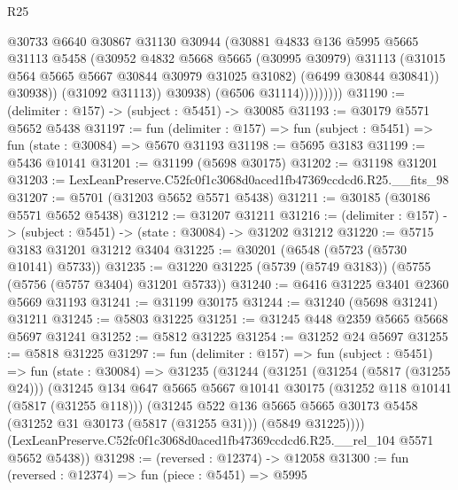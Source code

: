 \begin{lexlean}{R25}
\begin{coremodule}
                          @30733
                          @6640
                          @30867
                          @31130
                          @30944
                          (@30881
                            @4833
                            @136
                            @5995
                            @5665
                            @31113
                            @5458
                            (@30952
                              @4832
                              @5668
                              @5665
                              (@30995 @30979)
                              @31113
                              (@31015 @564 @5665 @5667 @30844 @30979 @31025 @31082)
                              (@6499 @30844 @30841))
                            @30938))
                        (@31092 @31113))
                      @30938)
                    (@6506 @31114)))))))))
@31190 := (delimiter : @157) -> (subject : @5451) -> @30085
@31193 := @30179 @5571 @5652 @5438
@31197 := fun (delimiter : @157) => fun (subject : @5451) => fun (state : @30084) => @5670 @31193
@31198 := @5695 @3183
@31199 := @5436 @10141
@31201 := @31199 (@5698 @30175)
@31202 := @31198 @31201
@31203 := LexLeanPreserve.C52fc0f1c3068d0aced1fb47369ccdcd6.R25.__fits_98
@31207 := @5701 (@31203 @5652 @5571 @5438)
@31211 := @30185 (@30186 @5571 @5652 @5438)
@31212 := @31207 @31211
@31216 := (delimiter : @157) -> (subject : @5451) -> (state : @30084) -> @31202 @31212
@31220 := @5715 @3183 @31201 @31212 @3404
@31225 := @30201 (@6548 (@5723 (@5730 @10141) @5733))
@31235 := @31220 @31225 (@5739 (@5749 @3183)) (@5755 (@5756 (@5757 @3404) @31201 @5733))
@31240 := @6416 @31225 @3401 @2360 @5669 @31193
@31241 := @31199 @30175
@31244 := @31240 (@5698 @31241) @31211
@31245 := @5803 @31225
@31251 := @31245 @448 @2359 @5665 @5668 @5697 @31241
@31252 := @5812 @31225
@31254 := @31252 @24 @5697
@31255 := @5818 @31225
@31297 := fun (delimiter : @157) =>
  fun (subject : @5451) =>
  fun (state : @30084) =>
  @31235
    (@31244
      (@31251
        (@31254 (@5817 (@31255 @24)))
        (@31245
          @134
          @647
          @5665
          @5667
          @10141
          @30175
          (@31252 @118 @10141 (@5817 (@31255 @118)))
          (@31245
            @522
            @136
            @5665
            @5665
            @30173
            @5458
            (@31252 @31 @30173 (@5817 (@31255 @31)))
            (@5849 @31225))))
      (LexLeanPreserve.C52fc0f1c3068d0aced1fb47369ccdcd6.R25.__rel_104 @5571 @5652 @5438))
@31298 := (reversed : @12374) -> @12058
@31300 := fun (reversed : @12374) => fun (piece : @5451) => @5995

\end{coremodule}
\end{lexlean}
